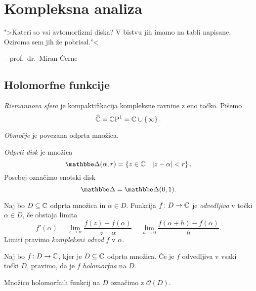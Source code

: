 \section{Kompleksna analiza}

\epigraph{">Kateri so vsi avtomorfizmi diska? V bistvu jih imamo na
tabli napisane. Oziroma sem jih že pobrisal."<}
{-- prof.~dr.~Miran Černe}

\subsection{Holomorfne funkcije}


\begin{definicija}
\emph{Riemannova sfera} je kompaktifikacija
kompleksne ravnine z eno točko. Pišemo
\[
\widehat{\mathbb{C}} = \mathbb{C}\!\operatorname{P}^{1} = \mathbb{C} \cup \left\{\infty\right\}.
\]
\end{definicija}

\begin{definicija}
\emph{Območje} je povezana odprta množica.
\end{definicija}

\begin{definicija}
\emph{Odprti disk} je množica
\[
\dsk(\alpha, r) = \setb{z \in \C}{\abs{z - \alpha} < r}.
\]
Posebej označimo enotski disk
\[
\dsk = \dsk(0, 1).
\]
\end{definicija}

\begin{definicija}
Naj bo $D \subseteq \mathbb{C}$ odprta množica in $\alpha \in D$. Funkcija
$f \colon D \to \mathbb{C}$ je
\emph{odvedljiva} v točki
$\alpha \in D$, če obstaja limita
\[
f'(\alpha) =
\lim_{z \to \alpha} \frac{f(z) - f(\alpha)}{z - \alpha} =
\lim_{h \to 0} \frac{f(\alpha + h) - f(\alpha)}{h}.
\]
Limiti pravimo \emph{kompleksni odvod} $f$ v $\alpha$.
\end{definicija}

\begin{definicija}
Naj bo $f \colon D \to \mathbb{C}$, kjer je $D \subseteq \mathbb{C}$ odprta
množica. Če je $f$ odvedljiva v vsaki točki $D$, pravimo, da je $f$
\emph{holomorfna} na $D$.
\end{definicija}

\begin{opomba}
Množico holomorfnih funkcij na $D$ označimo z $\mathcal{O}(D)$.
\end{opomba}

